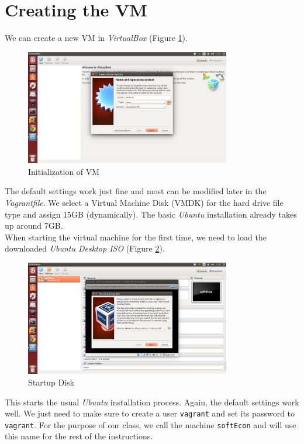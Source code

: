 \section{Creating the VM}
We can create a new VM in \textit{VirtualBox} (Figure \ref{Initialization of VM}). 
%
\begin{figure}[h!]\centering\caption{Initialization of VM}\vspace{0.3cm}\label{Initialization of VM}
\includegraphics[width=0.8\textwidth]{material/virtualbox-start.png}
\end{figure}
%
The default settings work just fine and most can be modified later in the \textit{Vagrantfile}. We select a Virtual Machine Disk (VMDK) for the hard drive file type and assign 15GB (dynamically). The basic \textit{Ubuntu} installation already takes up around 7GB. \\\newline
%
When starting the virtual machine for the first time, we need to load the downloaded \textit{Ubuntu Desktop ISO} (Figure \ref{Startup Disk}).
%
\begin{figure}[h!]\centering\caption{Startup Disk}\vspace{0.3cm}\label{Startup Disk}
\includegraphics[width=0.8\textwidth]{material/startup-disk.png}
\end{figure}
%
This starts the usual \textit{Ubuntu} installation process. Again, the default settings work well. We just need to make sure to create a user \verb+vagrant+ and set its password to \verb+vagrant+. For the purpose of our class, we call the machine \verb+softEcon+ and will use this name for the rest of the instructions.  
